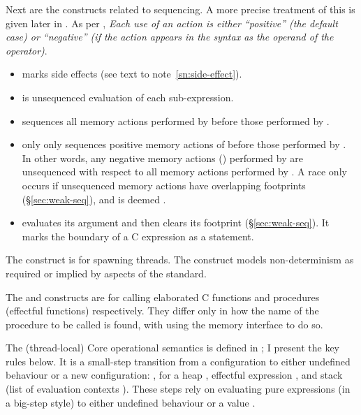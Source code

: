 Next are the constructs related to sequencing. A more precise treatment
of this is given later in . As per
, \emph{Each use of an action is either
``positive'' (the default case) or ``negative'' (if the action appears in the
syntax as the operand of the  operator)}.
\begin{itemize}
    \item {} marks side
        effects (see text to note~\ref{sn:side-effect}).
    \item {} is unsequenced evaluation of each
        sub-expression.
    \item {} sequences all memory actions performed by
         before those performed by .
    \item {} only only sequences positive memory actions of
         before those performed by . In other words,
        any negative memory actions () performed by
         are unsequenced with respect to all memory actions
        performed by . A race only occurs if unsequenced memory
        actions have overlapping footprints (\S\ref{sec:weak-seq}), and is
        deemed .
    \item {} evaluates its argument  and
        then clears its footprint (\S\ref{sec:weak-seq}). It marks the
        boundary of a C expression as a statement.
\end{itemize}

The  construct is for spawning threads. The
 construct models non-determinism as required or
implied by aspects of the standard.

The  and  constructs are for
calling elaborated C functions and  procedures (effectful functions)
respectively. They differ only in how the name of the procedure to be called is
found, with  using the memory interface to do so.

The (thread-local) Core operational semantics is defined in
\textcite{memarian2022cerberus}; I present the key rules below.
It is a small-step transition from a configuration to either undefined
behaviour or a new configuration: ,
for a heap , effectful expression , and stack \sm{\kappa} (list of
evaluation contexts ). These steps rely on evaluating pure expressions (in a
big-step style) to either undefined behaviour or a value .

